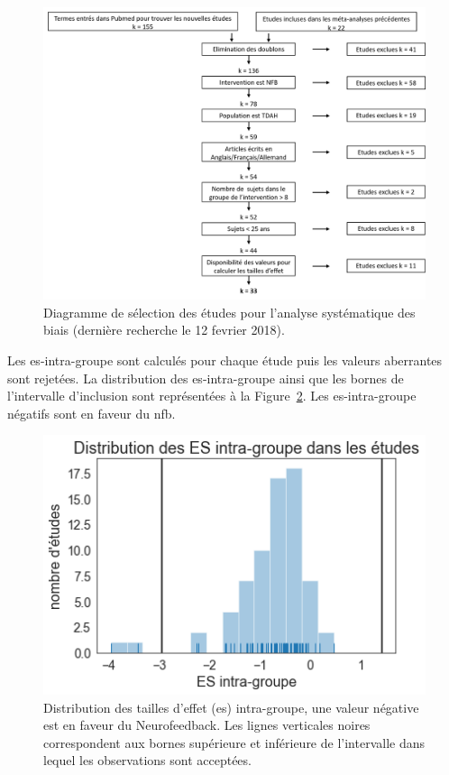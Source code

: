 \newpage\
\begin{figure}[h!]
  \centering
	\includegraphics[width=1.0\linewidth]{figures/chapter-3/factors-selection-studies} 
  \caption{Diagramme de sélection des études pour l'analyse systématique des biais (dernière recherche le 12 fevrier 2018).}
  \label{Figure:factors_pipeline_selection_studies}
\end{figure}

Les \gls{es}-intra-groupe sont calculés pour chaque étude puis les valeurs aberrantes sont rejetées. La distribution des \gls{es}-intra-groupe ainsi que les bornes 
de l'intervalle d'inclusion sont représentées à la Figure~\ref{Figure:distribution_ES_within}. Les \gls{es}-intra-groupe négatifs sont en faveur du \gls{nfb}.

\begin{figure}[h!]
  \centering
	\includegraphics[width=0.7\linewidth]{figures/chapter-3/distribution-ES-within} 
  \caption{Distribution des tailles d'effet (\gls{es}) intra-groupe, une valeur négative est en faveur du Neurofeedback. Les lignes verticales noires correspondent aux bornes supérieure et 
	inférieure de l'intervalle dans lequel les observations sont acceptées.}
  \label{Figure:distribution_ES_within}
\end{figure}

